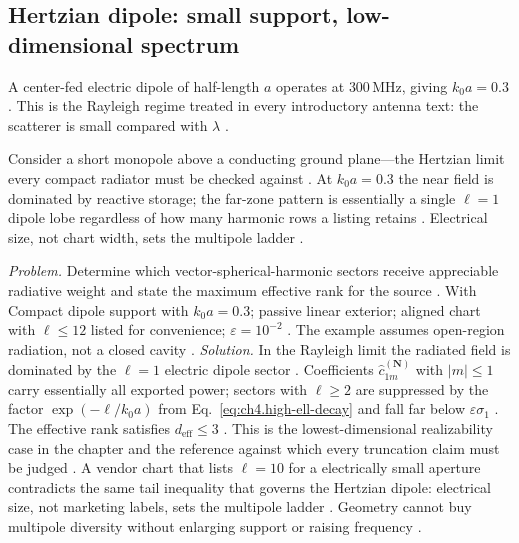 \subsection{Hertzian dipole: small support, low-dimensional spectrum}
\label{sec:ch4106}
A center-fed electric dipole of half-length $a$ operates at $300\,\mathrm{MHz}$, giving $k_{0}a=0.3$. This is the Rayleigh regime treated in every introductory antenna text: the scatterer is small compared with $\lambda$ \cite{jackson1999}.
\begin{physicalvignette}
Consider a short monopole above a conducting ground plane---the Hertzian limit every compact radiator must be checked against \cite{jackson1999}. At $k_{0}a=0.3$ the near field is dominated by reactive storage; the far-zone pattern is essentially a single $\ell=1$ dipole lobe regardless of how many harmonic rows a listing retains \cite{chu1948}. Electrical size, not chart width, sets the multipole ladder \cite{devaney2004}.
\end{physicalvignette}
\emph{Problem.} Determine which vector-spherical-harmonic sectors receive appreciable radiative weight and state the maximum effective rank for the source .
With Compact dipole support with $k_{0}a=0.3$; passive linear exterior; aligned chart with $\ell\le12$ listed for convenience; $\varepsilon=10^{-2}$ . The example assumes open-region radiation, not a closed cavity .
\emph{Solution.} In the Rayleigh limit the radiated field is dominated by the $\ell=1$ electric dipole sector . Coefficients $\widehat{c}_{1m}^{(\mathbf{N})}$ with $|m|\le1$ carry essentially all exported power; sectors with $\ell\ge2$ are suppressed by the factor $\exp(-\ell/k_{0}a)$ from Eq.~\eqref{eq:ch4.high-ell-decay} and fall far below $\varepsilon\sigma_{1}$ . The effective rank satisfies $d_{\mathrm{eff}}\le 3$ .
This is the lowest-dimensional realizability case in the chapter and the reference against which every truncation claim must be judged . A vendor chart that lists $\ell=10$ for a electrically small aperture contradicts the same tail inequality that governs the Hertzian dipole: electrical size, not marketing labels, sets the multipole ladder . Geometry cannot buy multipole diversity without enlarging support or raising frequency .
